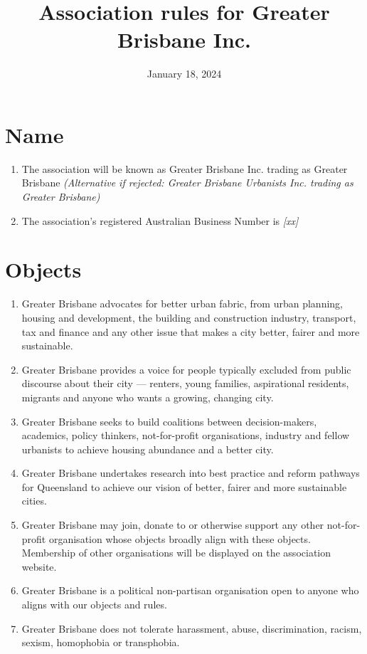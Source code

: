 \documentclass[11pt, oneside]{article}
\begin{document}
\title{\textbf{Association rules for Greater Brisbane Inc.}}
\date{January 18, 2024}
\maketitle
\tableofcontents

\newpage

\section{Name}
\begin{enumerate}
\item The association will be known as Greater Brisbane Inc. trading as Greater Brisbane \textit{(Alternative if rejected: Greater Brisbane Urbanists Inc. trading as Greater Brisbane)}
\item The association’s registered Australian Business Number is \textit{[xx]}
\end{enumerate}

\section{Objects}
\begin{enumerate}

\item Greater Brisbane advocates for better urban fabric, from urban planning, housing and development, the building and construction industry, transport, tax and finance and any other issue that makes a city better, fairer and more sustainable. 
\item Greater Brisbane provides a voice for people typically excluded from public discourse about their city — renters, young families, aspirational residents, migrants and anyone who wants a growing, changing city.
\item Greater Brisbane seeks to build coalitions between decision-makers, academics, policy thinkers, not-for-profit organisations, industry and fellow urbanists to achieve housing abundance and a better city. 
\item Greater Brisbane undertakes research into best practice and reform pathways for Queensland to achieve our vision of better, fairer and more sustainable cities. 
\item Greater Brisbane may join, donate to or otherwise support any other not-for-profit organisation whose objects broadly align with these objects. Membership of other organisations will be displayed on the association website.
\item Greater Brisbane is a political non-partisan organisation open to anyone who aligns with our objects and rules. 
\item Greater Brisbane does not tolerate harassment, abuse, discrimination, racism, sexism, homophobia or transphobia. 
\end{enumerate}
\end{document}
